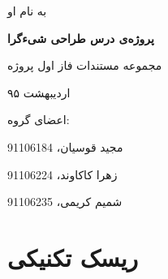 \documentclass{article}
\begin{document}
	\begin{titlepage}
	\centering
	
		{\Large به نام او  \par}
		\vspace{2cm}
		
		{\Huge \bfseries پروژه‌ی درس طراحی شیءگرا \par}
		\vspace{3cm}

		{\LARGE  مجموعه مستندات فاز اول پروژه \par}
		\vspace{0.3cm}

		{\LARGE اردیبهشت ۹۵ \par}
		\vspace{4cm}

		{\Large اعضای گروه: \par}
		\vspace{0.5cm}

		{\Large مجید قوسیان، 91106184 \par}
		\vspace{0.1cm}

		{\Large زهرا کاکاوند، 91106224 \par}
	\vspace{0.1cm}

{\Large شمیم کریمی، 91106235 \par}
		
\end{titlepage}

\tableofcontents







\newpage
\section{ریسک تکنیکی}
\end{document}
